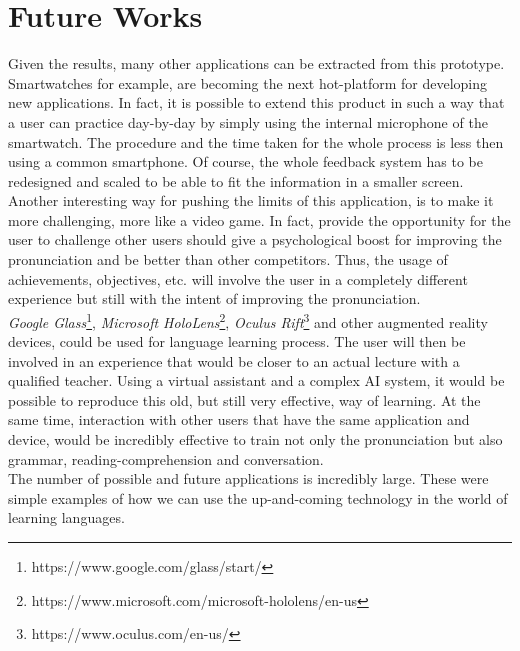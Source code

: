 \chapter{Future Works}
\label{ch:Future Works}

Given the results, many other applications can be extracted from this prototype. Smartwatches for example, are becoming the next hot-platform for developing new applications. In fact, it is possible to extend this product in such a way that a user can practice day-by-day by simply using the internal microphone of the smartwatch. The procedure and the time taken for the whole process is less then using a common smartphone. Of course, the whole feedback system has to be redesigned and scaled to be able to fit the information in a smaller screen. \\

\noindent Another interesting way for pushing the limits of this application, is to make it more challenging, more like a video game. In fact, provide the opportunity for the user to challenge other users should give a psychological boost for improving the pronunciation and be better than other competitors. Thus, the usage of achievements, objectives, etc. will involve the user in a completely different experience but still with the intent of improving the pronunciation. \\

\noindent \textit{Google Glass}\footnote{https://www.google.com/glass/start/}, \textit{Microsoft HoloLens}\footnote{https://www.microsoft.com/microsoft-hololens/en-us}, \textit{Oculus Rift}\footnote{https://www.oculus.com/en-us/} and other augmented reality devices, could be used for language learning process. The user will then be involved in an experience that would be closer to an actual lecture with a qualified teacher. Using a virtual assistant and a complex AI system, it would be possible to reproduce this old, but still very effective, way of learning. At the same time, interaction with other users that have the same application and device, would be incredibly effective to train not only the pronunciation but also grammar, reading-comprehension and conversation. \\

\noindent The number of possible and future applications is incredibly large. These were simple examples of how we can use the up-and-coming technology in the world of learning languages.
